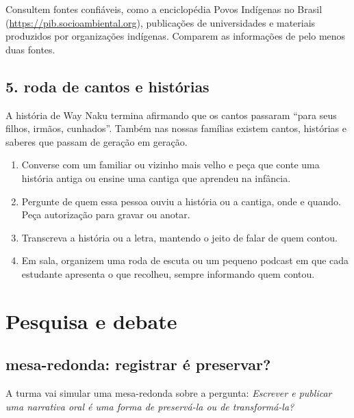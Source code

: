 {\raggedright Consultem fontes confiáveis, como a enciclopédia Povos
Indígenas no Brasil (\url{https://pib.socioambiental.org}), publicações
de universidades e materiais produzidos por organizações indígenas.
Comparem as informações de pelo menos duas fontes.\par}

\section{5. roda de cantos e histórias}

A história de Way Naku termina afirmando que os cantos passaram ``para
seus filhos, irmãos, cunhados''. Também nas nossas famílias existem
cantos, histórias e saberes que passam de geração em geração.

\begin{enumerate}[label=\arabic*.]
\item Converse com um familiar ou vizinho mais velho e peça que conte
uma história antiga ou ensine uma cantiga que aprendeu na infância.
\item Pergunte de quem essa pessoa ouviu a história ou a cantiga, onde e
quando. Peça autorização para gravar ou anotar.
\item Transcreva a história ou a letra, mantendo o jeito de falar de
quem contou.
\item Em sala, organizem uma roda de escuta ou um pequeno podcast em que
cada estudante apresenta o que recolheu, sempre informando quem contou.
\end{enumerate}

\chapter{Pesquisa e debate}

\section{mesa-redonda: registrar é preservar?}

A turma vai simular uma mesa-redonda sobre a pergunta: \textit{Escrever
e publicar uma narrativa oral é uma forma de preservá-la ou de
transformá-la?}

